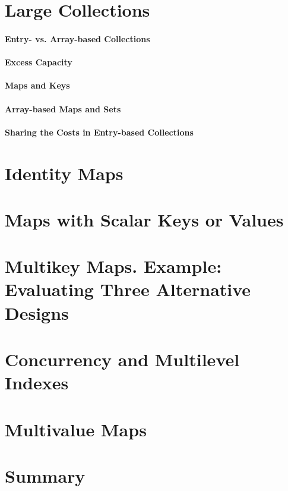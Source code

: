\section{Large Collections}

\paragraph{Entry- vs. Array-based Collections}

\paragraph{Excess Capacity}

\paragraph{Maps and Keys}

\paragraph{Array-based Maps and Sets}

\paragraph{Sharing the Costs in Entry-based Collections}

\section{Identity Maps}

\section{Maps with Scalar Keys or Values}

\section{Multikey Maps. Example: Evaluating Three Alternative Designs}

\section{Concurrency and Multilevel Indexes}

\section{Multivalue Maps}

\section{Summary}

